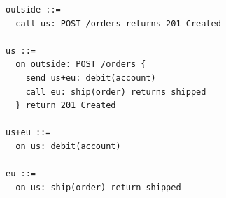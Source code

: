 \begin{lstlisting}[language={}]
outside ::=
  call us: POST /orders returns 201 Created

us ::=
  on outside: POST /orders {
    send us+eu: debit(account)
    call eu: ship(order) returns shipped
  } return 201 Created

us+eu ::=
  on us: debit(account)

eu ::=
  on us: ship(order) return shipped
\end{lstlisting}
